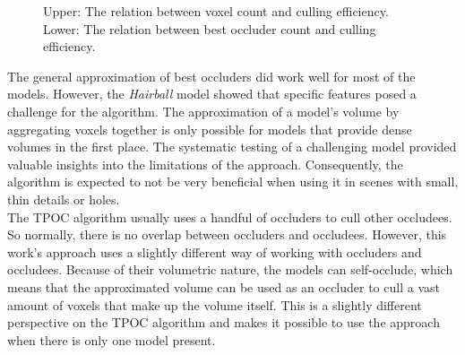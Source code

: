 \begin{figure}[!htb]
    \caption{Upper: The relation between voxel count and culling efficiency.
    Lower: The relation between best occluder count and culling efficiency.}
    \label{plt:culling-efficiency-voxel-node-count}
\end{figure}

\noindent
The general approximation of best occluders did work well for most of the models. However, the \emph{Hairball} model showed that specific 
features posed a challenge for the algorithm. The approximation of a model's volume by aggregating voxels together is only possible for 
models that provide dense volumes in the first place. The systematic testing of a challenging model provided valuable insights into the 
limitations of the approach. Consequently, the algorithm is expected to not be very beneficial when using it in scenes with small, thin 
details or holes.\\





\noindent
The \ac{TPOC} algorithm usually uses a handful of occluders to cull other occludees. So normally, there is no overlap between occluders and 
occludees. However, this work's approach uses a slightly different way of working with occluders and occludees. Because of their volumetric 
nature, the models can self-occlude, which means that the approximated volume can be used as an occluder to cull a vast amount of voxels that 
make up the volume itself. This is a slightly different perspective on the \ac{TPOC} algorithm and makes it possible to use the approach when 
there is only one model present. \\

